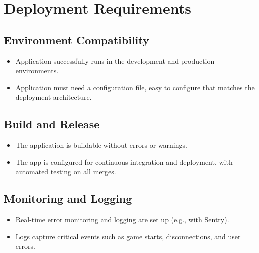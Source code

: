 \documentclass{article}
\begin{document}
\section{Deployment Requirements}
\subsection{Environment Compatibility}
\begin{itemize}
    \item Application successfully runs in the development and production environments.
    \item Application must need a configuration file, easy to configure that matches the deployment architecture.
\end{itemize}
\subsection{Build and Release}
\begin{itemize}
    \item The application is buildable without errors or warnings.
    \item The app is configured for continuous integration and deployment, with automated testing on all merges.
\end{itemize}
\subsection{Monitoring and Logging}
\begin{itemize}
    \item Real-time error monitoring and logging are set up (e.g., with Sentry).
    \item Logs capture critical events such as game starts, disconnections, and user errors.
\end{itemize}
\end{document}
